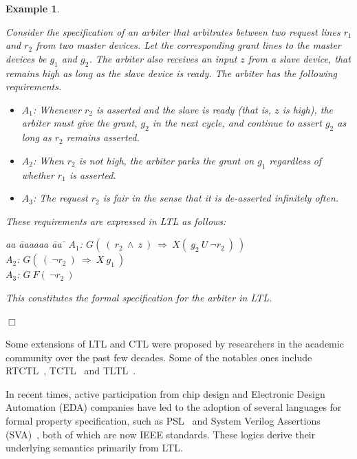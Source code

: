 \documentclass[a4paper, 11pt]{article}
\newtheorem{example}{Example} %
\begin{document}
\begin{example}\label{ex1.1}
{\em Consider the specification of an arbiter that arbitrates between two 
request
lines $r_1$ and $r_2$ from two master devices. Let the corresponding grant
lines to the master devices be $g_1$ and $g_2$. The arbiter also receives
an input $z$ from a slave device, that remains high as long as the slave
device is {\em ready}.
The arbiter has the following requirements.

\begin{itemize} 
\item $A_1$: Whenever $r_2$ is asserted and the slave is ready (that is, $z$ is
high), the arbiter must give the grant, $g_2$ in the next cycle, and continue
to assert $g_2$ as long as $r_2$ remains asserted. 
\item $A_2$: When $r_2$ is not high,
the arbiter parks the grant on $g_1$ regardless of whether $r_1$ is asserted.
\item $A_3$: The request $r_2$ is fair in the sense that it
is de-asserted infinitely often.
\end{itemize}

\noindent
These requirements are expressed in LTL as follows:
\begin{tabbing}
aa \= aaaaaa \= aa \= \kill
\> $A_1$: \>
    $G(\ (\ r_2\ \land\ z\ )\ \Rightarrow\ X(\ g_2\ U\ \lnot r_2\ )\ )$\\
\> $A_2$: \>
    $G(\ (\ \lnot r_2\ )\ \Rightarrow\ X\ g_1\ )$ \\
\> $A_3$: \>
    $G\ F(\ \lnot r_2\ )$
\end{tabbing}

\noindent
This constitutes the formal specification for the arbiter in LTL.
} $\Box$
\end{example}

\noindent
Some extensions of LTL and CTL were proposed by researchers in the 
academic community over the past few decades. Some of the notables 
ones include RTCTL~\cite{Emerson:89}, TCTL~\cite{Alur:93}
and TLTL~\cite{Alur:94}.

In recent times, active participation from chip design and Electronic
Design Automation (EDA) companies have led to the adoption
of several languages for formal property specification, such as
PSL~\cite{psl} and System Verilog Assertions (SVA)~\cite{sva},
both of which are now IEEE standards. These logics derive their 
underlying semantics primarily from LTL.
\end{document}
